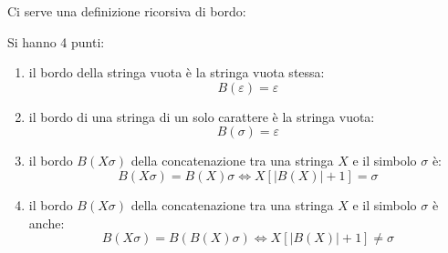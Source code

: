 Ci serve una definizione ricorsiva di bordo:
\begin{definizione}
  Si hanno 4 punti:
  \begin{enumerate}
    \item il bordo della stringa vuota è la stringa vuota stessa:
    \[B(\varepsilon)=\varepsilon\]
    \item il bordo di una stringa di un solo carattere è la stringa vuota:
    \[B(\sigma)=\varepsilon\]
    
    \item il bordo $B(X\sigma)$ della concatenazione tra una stringa $X$ e il
    simbolo $\sigma$ è:
    \[B(X\sigma)=B(X)\sigma\iff X[|B(X)|+1]=\sigma\]
    \item il bordo $B(X\sigma)$ della concatenazione tra una stringa $X$ e il
    simbolo $\sigma$ è anche:
    \[B(X\sigma)= B(B(X)\sigma)\iff X[|B(X)|+1]\neq\sigma\]
  \end{enumerate}
\end{definizione}
